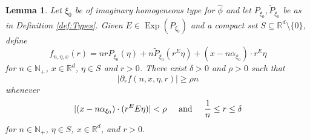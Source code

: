 \documentclass[11pt]{article}
\newtheorem{lemma}[theorem]{Lemma}
\newcommand\Exp{\operatorname{Exp}}
\begin{document}
\begin{lemma}
Let $\xi_0$ be of imaginary homogeneous type for $\widehat{\phi}$ and let $P_{\xi_0},\widetilde{P}_{\xi_0}$ be as in Definition \ref{def:Types}. Given $E\in \Exp(P_{\xi_0})$ and a compact set $S\subseteq \mathbb{R}^d\setminus\{0\}$, define
\begin{equation*}
    f_{n,\eta,x}(r)=n r P_{\xi_0}(\eta)+n\widetilde{P}_{\xi_0}(r^E\eta)+(x-n\alpha_{\xi_0})\cdot r^E\eta
\end{equation*}
for $n\in\mathbb{N}_+$, $x\in\mathbb{R}^d$, $\eta\in S$ and $r>0$. There exist $\delta>0$ and $\rho>0$ such that
\begin{equation*}
    |\partial_r f(n,x,\eta,r)|\geq \rho n
\end{equation*}
whenever
\begin{equation*}
    |(x-n\alpha_{\xi_0})\cdot (r^E E\eta)|<\rho\hspace{.5cm}\mbox{and}\hspace{.5cm}\frac{1}{n}\leq r\leq \delta
\end{equation*}
for $n\in\mathbb{N}_+$, $\eta\in S$,  $x\in\mathbb{R}^d$, and $r>0$.
\end{lemma}
\end{document}
